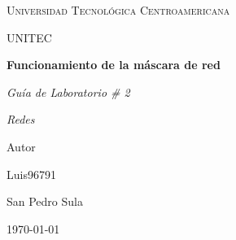 
\begin{titlepage}
    \centering
    {\scshape\LARGE Universidad Tecnol\'ogica Centroamericana \par}
    \vspace{0.5cm}
    {\scshape\LARGE UNITEC \par}
    \vspace{2cm}

    {\huge\bfseries Funcionamiento de la m\'ascara de red\par}
    \vspace{1cm}
    {\Large\itshape Gu\'ia de Laboratorio \# 2\par}
    \vspace{1cm}
    {\Large\itshape Redes\par}
	\vspace{3cm}
    
    Autor\par
	Luis96791
    \vspace{6cm}
    
    {San Pedro Sula \par}
    \vspace{0.5cm}
    
    {\large \today\par}
\end{titlepage}
